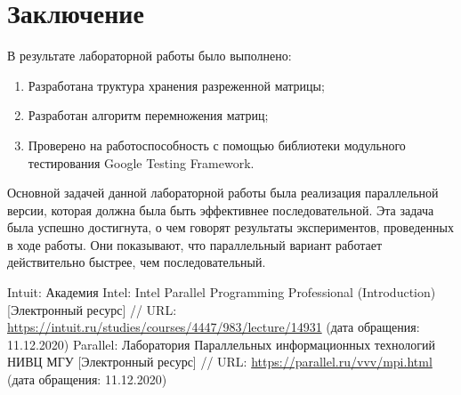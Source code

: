 \documentclass{report}
\begin{document}
\newpage
\section*{Заключение}
\par В результате лабораторной работы было выполнено:
\begin{enumerate}
\item Разработана труктура хранения разреженной матрицы;
\item Разработан алгоритм перемножения матриц;
\item Проверено на работоспособность с помощью библиотеки модульного тестирования Google Testing Framework.
\end{enumerate}
\par Основной задачей данной лабораторной работы была реализация параллельной версии, которая должна была быть эффективнее последовательной. Эта задача была успешно достигнута, о чем говорят результаты экспериментов, проведенных в ходе работы. Они показывают, что параллельный вариант работает действительно быстрее, чем последовательный.
\newpage

\begin{thebibliography}{1}
 Intuit: Академия Intel: Intel Parallel Programming Professional (Introduction) [Электронный ресурс] // URL: \url { https://intuit.ru/studies/courses/4447/983/lecture/14931} (дата обращения: 11.12.2020)
 Parallel: Лаборатория Параллельных информационных технологий НИВЦ МГУ [Электронный ресурс] // URL: \url {https://parallel.ru/vvv/mpi.html} (дата обращения: 11.12.2020)

\end{thebibliography}

\newpage
\end{document}
